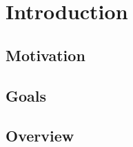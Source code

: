 \chapter{Introduction}
\label{chap:intro}
\minitoc

\section{Motivation}
\section{Goals}
\section{Overview}